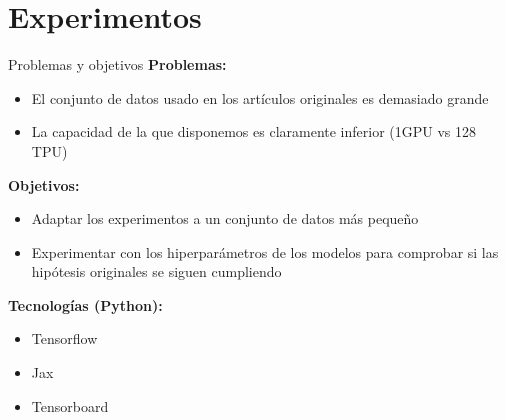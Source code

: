 \documentclass[aspectratio=169]{beamer}
\begin{document}
  \section{Experimentos}
  
  \begin{frame}{Problemas y objetivos}
    \textbf{Problemas:}
    \pause
    \begin{itemize}
      \item El conjunto de datos usado en los artículos originales es demasiado grande
      \pause
      \item La capacidad de la que disponemos es claramente inferior (1GPU vs 128 TPU)
    \end{itemize}

    \pause

    \textbf{Objetivos:}
    \begin{itemize}
      \item Adaptar los experimentos a un conjunto de datos más pequeño
      \pause
      \item Experimentar con los hiperparámetros de los modelos para comprobar si las hipótesis originales se siguen cumpliendo
    
    \end{itemize}

    \pause
    \textbf{Tecnologías (Python):}
    \begin{itemize}
      \item Tensorflow
      \item Jax
      \item Tensorboard
    \end{itemize}
  \end{frame}
\end{document}

